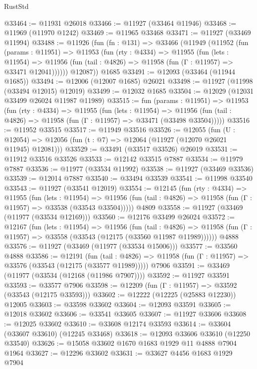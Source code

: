 \begin{lexlean}{RustStd}
\begin{coremodule}
@33464 := @11931 @26018
@33466 := @11927 (@33464 @11946)
@33468 := @11969 (@11970 @1242)
@33469 := @11965 @33468
@33471 := @11927 (@33469 @11994)
@33488 := @11926
    (fun (fn : @131) =>
    @33466
      (@11949
        (@11952
          (fun (params : @11951) =>
          @11953
            (fun (rty : @4334) =>
            @11955
              (fun (lets : @11954) =>
              @11956 (fun (tail : @4826) => @11958 (fun (Γ : @11957) => @33471 @12041))))))
        @12087))
    @1685
@33491 := @12093 (@33464 (@11944 @1685))
@33494 := @12006 (@12007 @1685) @26021
@33498 := @11927 (@11998 (@33494 @12015) @12019)
@33499 := @12032 @1685
@33504 := @12029 (@12031 @33499 @26024 @11987 @11989)
@33515 := fun (params : @11951) =>
  @11953
    (fun (rty : @4334) =>
    @11955
      (fun (lets : @11954) =>
      @11956 (fun (tail : @4826) => @11958 (fun (Γ : @11957) => @33471 (@33498 @33504)))))
@33516 := @11952 @33515
@33517 := @11949 @33516
@33526 := @12055
    (fun (U : @12054) => @12056 (fun (t : @7) => @12064 (@11927 (@12070 @26021 @11945) @12081)))
@33529 := @33491 (@33517 @33526) @26019
@33531 := @11912 @33516 @33526
@33533 := @12142 @33515 @7887
@33534 := @11979 @7887
@33536 := @11977 (@33534 @11992)
@33538 := @11927 (@33469 @33536)
@33539 := @12014 @7887
@33540 := @33494 @33539
@33541 := @11998 @33540
@33543 := @11927 (@33541 @12019)
@33554 := @12145
    (fun (rty : @4334) =>
    @11955
      (fun (lets : @11954) =>
      @11956 (fun (tail : @4826) => @11958 (fun (Γ : @11957) => @33538 (@33543 @33504)))))
    @4809
@33558 := @11927 (@33469 (@11977 (@33534 @12169)))
@33560 := @12176 @33499 @26024
@33572 := @12167
    (fun (lets : @11954) =>
    @11956
      (fun (tail : @4826) =>
      @11958 (fun (Γ : @11957) => @33558 (@33543 (@12175 (@33560 @11987 @11989))))))
    @4888
@33576 := @11927 (@33469 (@11977 (@33534 @15006)))
@33577 := @33560 @4888
@33586 := @12191
    (fun (tail : @4826) => @11958 (fun (Γ : @11957) => @33576 (@33543 (@12175 (@33577 @11989)))))
    @7906
@33591 := @33469 (@11977 (@33534 (@12168 (@11986 @7907))))
@33592 := @11927 @33591
@33593 := @33577 @7906
@33598 := @12209 (fun (Γ : @11957) => @33592 (@33543 (@12175 @33593)))
@33602 := @12222 (@12225 (@25883 @12230)) @12005
@33603 := @33598 @33602
@33604 := @12093 @33591
@33605 := @12018 @33602
@33606 := @33541 @33605
@33607 := @11927 @33606
@33608 := @12025 @33602
@33610 := @33608 @12174 @33593
@33614 := @33604 (@33607 @33610) (@12245 @33468)
@33618 := @12093 @33606 @33610 (@12250 @33540)
@33626 := @15058 @33602 @1670 @1683 @1929 @11 @4888 @7904 @1964
@33627 := @12296 @33602
@33631 := @33627 @4456 @1683 @1929 @7904

\end{coremodule}
\end{lexlean}
